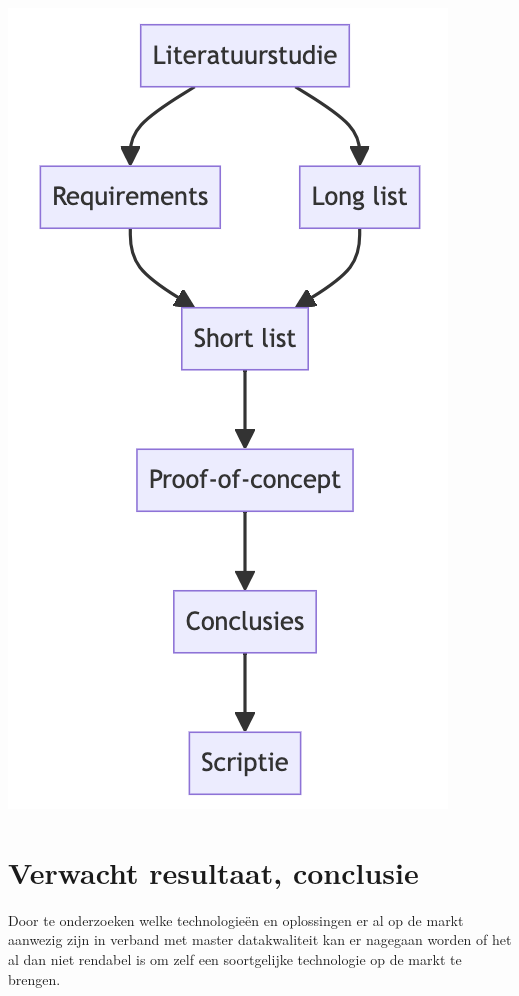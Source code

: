 \begin{center}
  \includegraphics[scale=0.4]{../images/methodologie.png}
\end{center}

\section{Verwacht resultaat, conclusie}%
\label{sec:verwachte_resultaten}

Door te onderzoeken welke technologieën en oplossingen er al op de markt aanwezig zijn in verband met master datakwaliteit kan er nagegaan worden of het al dan niet rendabel is om zelf een soortgelijke technologie op de markt te brengen. 

